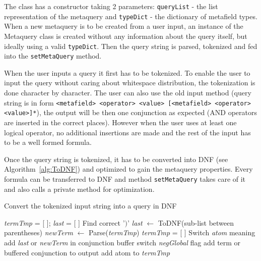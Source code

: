 The class has a constructor taking 2 parameters: \texttt{queryList} - the list representation of the 
metaquery and \texttt{typeDict} - the dictionary of metafield types. When a new metaquery is to be 
created from a user input, an instance of the Metaquery class is created without any information
about the query itself, but ideally using a valid \texttt{typeDict}. Then the query string is parsed, 
tokenized and fed into the \texttt{setMetaQuery} method.


When the user inputs a query it first has to be tokenized. To enable the user to input the query without caring 
about whitespace distribution, the tokenization is done character by character.
The user can also use the old input method (query string is in form 
\texttt{<metafield> <operator> <value> [<metafield> <operator> <value>]*}), the output will be then one conjunction 
as expected (AND operators are inserted in the 
correct places). However when the user uses at least one logical operator, no additional insertions are made
and the rest of the input has to be a well formed formula. 

Once the query string is tokenized, it has to be converted into DNF (see Algorithm~\ref{alg:ToDNF}) and optimized 
to gain the metaquery properties. Every formula can be transferred to DNF and  method \texttt{setMetaQuery} takes 
care of it and also calls a private method for optimization.

\begin{algorithm}[h]
\caption{Convert the tokenized input string into a query in DNF}
\label{alg:ToDNF}
\begin{algorithmic}[1]
\State \textit{termTmp} = [ ]; \textit{last} = [ ]
		\State Find correct '$)$'
		\State \textit{last} $\leftarrow$ ToDNF(sub-list between parentheses)
			\State \textit{newTerm} $\leftarrow$ Parse(\textit{termTmp})
			\State \textit{termTmp} = [ ]
			\State Switch \textit{atom} meaning
		\EndIf
			\State add \textit{last} or \textit{newTerm} in conjunction buffer
			\State switch \textit{negGlobal} flag
		\Else{}
			\State add term or buffered conjunction to output
		\EndIf
	\Else
		\State add atom to \textit{termTmp}
	\EndIf
\EndFor
\EndProcedure
\end{algorithmic}
\end{algorithm}


